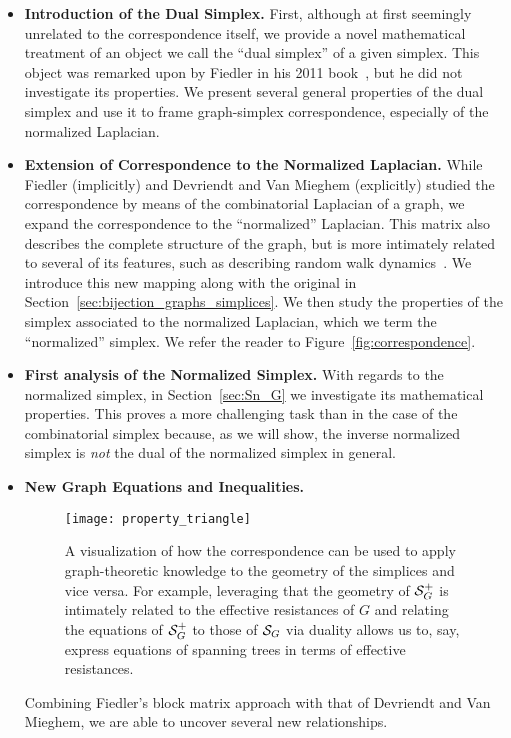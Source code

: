 \begin{itemize}
	\item {\bf Introduction of the Dual Simplex.} First, although at first seemingly unrelated to the correspondence itself, we provide a  novel mathematical treatment of an object we call the ``dual simplex'' of a given simplex. This object was remarked upon by Fiedler in his 2011 book~\cite{fiedler2011matrices}, but he did not investigate its properties. We present several general properties of  the dual simplex and use it to frame graph-simplex correspondence, especially of the normalized Laplacian. 
	\item {\bf Extension of Correspondence to the Normalized Laplacian. }While Fiedler (implicitly) and Devriendt and Van Mieghem (explicitly) studied the correspondence by means of the combinatorial Laplacian of a graph, we expand the correspondence to the ``normalized'' Laplacian.  This matrix also describes the complete structure of the graph, but is more intimately related to several of its features, such as describing random walk dynamics~\cite{chung1997spectral}. We introduce this new mapping  along with the original in Section~\ref{sec:bijection_graphs_simplices}. 
	We then study the properties of the simplex associated to the normalized Laplacian, which we term the ``normalized'' simplex.   We refer  the reader to Figure~\ref{fig:correspondence}. 
	\item {\bf First analysis of the Normalized Simplex. } With regards to the normalized simplex, in Section~\ref{sec:Sn_G} we investigate its mathematical properties. This proves a more challenging task   than  in  the case of the combinatorial simplex because, as we will show, the inverse normalized simplex  is \emph{not} the dual of the normalized  simplex in general.
	\item {\bf New Graph Equations and Inequalities.} 
	\begin{figure}
		\centering
		\texttt{[image: property\_triangle]}
		\caption{A visualization of how the correspondence can be used to apply graph-theoretic knowledge to the geometry  of the simplices and vice versa. For example, leveraging that the geometry of $\mathcal{S}_G^+$ is intimately related to the effective resistances of $G$ and relating the equations of $\mathcal{S}_G^+$  to those of $\mathcal{S}_G$ via duality allows us  to, say, express equations of spanning trees in terms of effective resistances.  }
		\label{fig:property_triangle}
	\end{figure}
	
	Combining Fiedler's block matrix approach with that of Devriendt and Van Mieghem, we are able to uncover several new relationships. 
	

\end{itemize}
